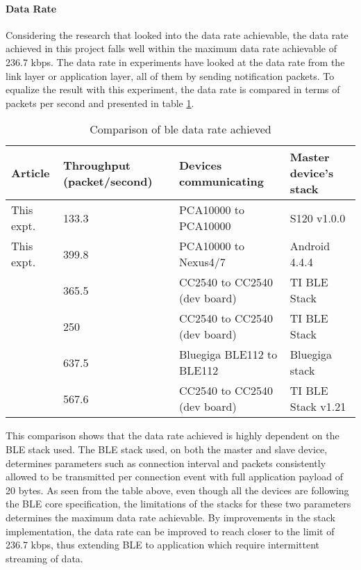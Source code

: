 \paragraph{Data Rate}
Considering the research that looked into the data rate achievable, the data rate achieved in this project falls well within the maximum data rate achievable\cite{Gomez2011} of 236.7 kbps. The data rate in experiments have looked at the data rate from the link layer\cite{Mikhaylov2013} or application layer\cite{Gomez2012}\cite{Mackensen2012}\cite{Kindt2014}, all of them by sending notification packets. To equalize the result with this experiment, the data rate is compared in terms of packets per second and presented in table \ref{tbl:dataRate}.

\begin{table}[h]
\centering
    \begin{tabular}[c]{|l|m{2.7cm}|l|l|}
    \hline
    Article    & Throughput (packet/second) & Devices communicating & Master device's stack \\ \hline
    This expt. & 133.3 & PCA10000 to PCA10000 & S120 v1.0.0    \\ \hline
    This expt. & 399.8 & PCA10000 to Nexus4/7 & Android 4.4.4  \\ \hline
    \cite{Gomez2012} & 365.5 & CC2540 to CC2540 (dev board) & TI BLE Stack \\ \hline
    \cite{Mackensen2012} & 250 & CC2540 to CC2540 (dev board) & TI BLE Stack \\ \hline
    \cite{Kindt2014} & 637.5 & Bluegiga BLE112 to BLE112 & Bluegiga stack \cite{MikkoSavolainen} \\ \hline
    \cite{Mikhaylov2013} & 567.6 & CC2540 to CC2540 (dev board) & TI BLE Stack v1.21 \\ \hline
    \end{tabular}
    \caption{Comparison of \gls{ble} data rate achieved}
    \label{tbl:dataRate}
\end{table}

This comparison shows that the data rate achieved is highly dependent on the BLE stack used. The BLE stack used, on both the master and slave device, determines parameters such as connection interval and packets consistently allowed to be transmitted per connection event with full application payload of 20 bytes. As seen from the table above, even though all the devices are following the BLE core specification, the limitations of the stacks for these two parameters determines the maximum data rate achievable. By improvements in the stack implementation, the data rate can be improved to reach closer to the limit of 236.7 kbps, thus extending BLE to application which require intermittent streaming of data.

